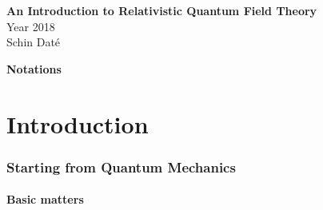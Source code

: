 \documentclass[12pt]{article}
\newcommand{\myqftsrcdirectory}[0]{myqft/src}
\newcounter{problem}
\begin{document}
\begin{titlepage} 
\vspace*{3cm}
\vspace*{2cm}
\noindent
\begin{center}
{\Huge \bf An Introduction to Relativistic Quantum Field Theory\\}  
\vspace{1cm}
{\large Year 2018}
\vspace{1cm}
\\
{\Large 
Schin Dat\'e}
\end{center}
\end{titlepage} 




\tableofcontents


\newpage %


\vspace*{-18mm}
\begin{center}
{\bf \Large Notations}
\end{center}
%


\setcounter{footnote}{0}
\setcounter{equation}{0}
\setcounter{figure}{0}
\setcounter{problem}{0}

\newpage
\part{Introduction}
\section{Starting from Quantum Mechanics}
\subsection{Basic matters}

\end{document}
